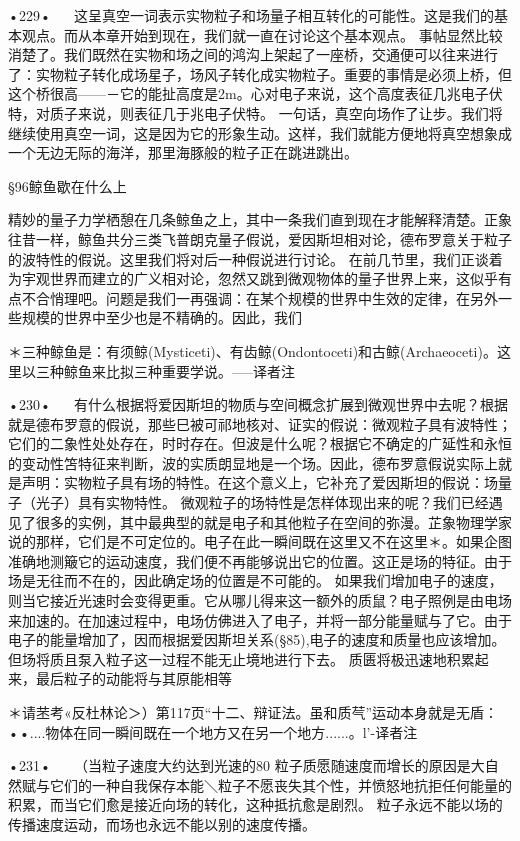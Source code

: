 •229•
  
这呈真空一词表示实物粒子和场量子相互转化的可能性。这是我们的基本观点。而从本章开始到现在，我们就一直在讨论这个基本观点。
事帖显然比较消楚了。我们既然在实物和场之间的鸿沟上架起了一座桥，交通便可以往来进行了：实物粒子转化成场星子，场风子转化成实物粒子。重要的事情是必须上桥，但这个桥很高——－它的能扯高度是2m。心对电子来说，这个高度表征几兆电子伏特，对质子来说，则表征几于兆电子伏特。
一句话，真空向场作了让步。我们将继续使用真空一词，这是因为它的形象生动。这样，我们就能方便地将真空想象成一个无边无际的海洋，那里海豚般的粒子正在跳进跳出。

§96鲸鱼歇在什么上

精妙的量子力学栖憩在几条鲸鱼之上，其中一条我们直到现在才能解释清楚。正象往昔一样，鲸鱼共分三类飞普朗克量子假说，爱因斯坦相对论，德布罗意关于粒子的波特性的假说。这里我们将对后一种假说进行讨论。
在前几节里，我们正谈着为宇观世界而建立的广义相对论，忽然又跳到微观物体的量子世界上来，这似乎有点不合悄理吧。问题是我们一再强调：在某个规模的世界中生效的定律，在另外一些规模的世界中至少也是不精确的。因此，我们

＊三种鲸鱼是：有须鲸(Mysticeti)、有齿鲸(Ondontoceti)和古鲸(Archaeoceti)。这里以三种鲸鱼来比拟三种重要学说。—--译者注

•230•
  
有什么根据将爱因斯坦的物质与空间概念扩展到微观世界中去呢？根据就是德布罗意的假说，那些巳被可祁地核对、证实的假说：微观粒子具有波特性；它们的二象性处处存在，时时存在。但波是什么呢？根据它不确定的广延性和永恒的变动性笘特征来判断，波的实质朗显地是一个场。因此，德布罗意假说实际上就是声明：实物粒子具有场的特性。在这个意义上，它补充了爱因斯坦的假说：场量子（光子）具有实物特性。
微观粒子的场特性是怎样体现出来的呢？我们已经遇见了很多的实例，其中最典型的就是电子和其他粒子在空间的弥漫。芷象物理学家说的那样，它们是不可定位的。电子在此一瞬间既在这里又不在这里＊。如果企图准确地测簸它的运动速度，我们便不再能够说出它的位置。这正是场的特征。由于场是无往而不在的，因此确定场的位置是不可能的。
如果我们增加电子的速度，则当它接近光速时会变得更重。它从哪儿得来这一额外的质鼠？电子照例是由电场来加速的。在加速过程中，电场仿佛进入了电子，并将一部分能量赋与了它。由于电子的能量增加了，因而根据爱因斯坦关系(§85),电子的速度和质量也应该增加。
但场将质且泵入粒子这一过程不能无止境地进行下去。
质匮将极迅速地积累起来，最后粒子的动能将与其原能相等

＊请苤考«反杜林论＞）第117页“十二、辩证法。虽和质芞”运动本身就是无盾：••....物体在同一瞬间既在一个地方又在另一个地方......。l'-译者注

•231•
  
（当粒子速度大约达到光速的80%
粒子质愿随速度而增长的原因是大自然赋与它们的一种自我保存本能＼粒子不愿丧失其个性，并愤怒地抗拒任何能量的积累，而当它们愈是接近向场的转化，这种抵抗愈是剧烈。
粒子永远不能以场的传播速度运动，而场也永远不能以别的速度传播。

